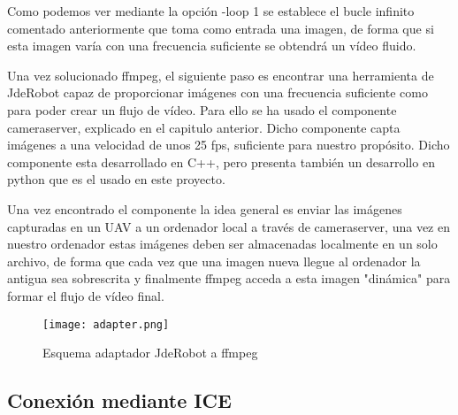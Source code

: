 Como podemos ver mediante la opción -loop 1 se establece el bucle infinito comentado anteriormente que toma como entrada una imagen, de forma que si esta imagen varía con una frecuencia suficiente se obtendrá un vídeo fluido.

Una vez solucionado ffmpeg, el siguiente paso es encontrar una herramienta de JdeRobot capaz de proporcionar imágenes con una frecuencia suficiente como para poder crear un flujo de vídeo. Para ello se ha usado el componente cameraserver, explicado en el capitulo anterior. Dicho componente capta imágenes a una velocidad de unos 25 fps, suficiente para nuestro propósito. Dicho componente esta desarrollado en C++, pero presenta también un desarrollo en python que es el usado en este proyecto. 

Una vez encontrado el componente la idea general es enviar las imágenes capturadas en un UAV a un ordenador local a través de cameraserver, una vez en nuestro ordenador estas imágenes deben ser almacenadas localmente en un solo archivo, de forma que cada vez que una imagen nueva llegue al ordenador la antigua sea sobrescrita y finalmente ffmpeg acceda a esta imagen "dinámica" para formar el flujo de vídeo final.

\begin{figure}[H]
    \centering
    \texttt{[image: adapter.png]}
    \caption{Esquema adaptador JdeRobot a ffmpeg}
\end{figure}

\subsection{Conexión mediante ICE}

